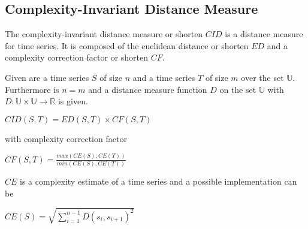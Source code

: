 \subsection{Complexity-Invariant Distance Measure}
The complexity-invariant distance measure \cite{batista2011complexity} or shorten $CID$ is a distance measure for time
series. It is composed of the euclidean distance or shorten $ED$ and a complexity correction factor or shorten $CF$.

Given are a time series $S$ of size $n$ and a time series $T$ of size $m$ over the set $\mathbb{U}$. Furthermore is
$n = m$ and a distance measure function $D$ on the set $\mathbb{U}$ with
$D: \mathbb{U} \times \mathbb{U} \to \mathbb{R}$ is given.
\begin{center}
    $CID(S, T) = ED(S, T) \times CF(S, T)$
\end{center}
with complexity correction factor
\begin{center}
    $CF(S, T) = \frac{max(CE(S), CE(T))}{min(CE(S), CE(T))}$
\end{center}
$CE$ is a complexity estimate of a time series and a possible implementation can be
\begin{center}
    $CE(S) = \sqrt{\sum \limits_{i=1}^{n-1} D(s_i, s_{i + 1})^2}$
\end{center}
